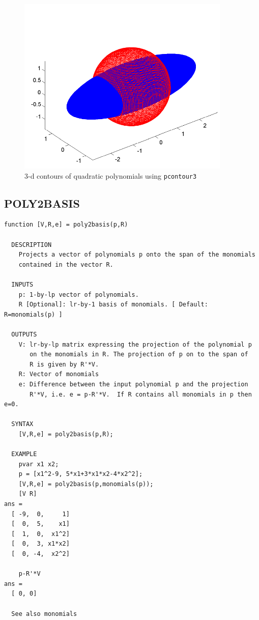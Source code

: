 \documentclass{article}
\begin{document}
\newpage
\begin{figure}[h]
\begin{center}
\includegraphics[width=4in]{figs/pcontour3PLOT.pdf}
\caption{3-d contours of quadratic polynomials using \texttt{pcontour3}}
\end{center}
\end{figure}


\newpage
\subsection{POLY2BASIS}
\begin{verbatim}
function [V,R,e] = poly2basis(p,R)

  DESCRIPTION
    Projects a vector of polynomials p onto the span of the monomials
    contained in the vector R.

  INPUTS
    p: 1-by-lp vector of polynomials.
    R [Optional]: lr-by-1 basis of monomials. [ Default: R=monomials(p) ]

  OUTPUTS
    V: lr-by-lp matrix expressing the projection of the polynomial p
       on the monomials in R. The projection of p on to the span of
       R is given by R'*V.
    R: Vector of monomials
    e: Difference between the input polynomial p and the projection
       R'*V, i.e. e = p-R'*V.  If R contains all monomials in p then e=0.

  SYNTAX
    [V,R,e] = poly2basis(p,R);

  EXAMPLE
    pvar x1 x2;
    p = [x1^2-9, 5*x1+3*x1*x2-4*x2^2];
    [V,R,e] = poly2basis(p,monomials(p));
    [V R]
ans =
  [ -9,  0,     1]
  [  0,  5,    x1]
  [  1,  0,  x1^2]
  [  0,  3, x1*x2]
  [  0, -4,  x2^2]

    p-R'*V
ans =
  [ 0, 0]

  See also monomials

\end{verbatim}
\end{document}

